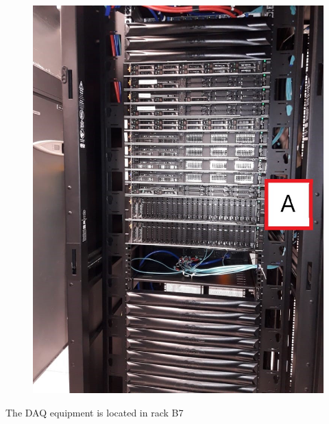 \begin{figure}
  \includegraphics[width=\textwidth]{images/10.jpg}
  \label{fig:jlsimon}
\end{figure}

The DAQ equipment is located in rack B7

